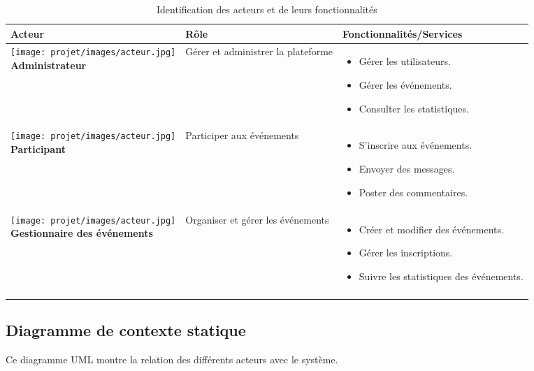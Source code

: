 \begin{longtable}{|p{4cm}|p{5cm}|p{6cm}|}
\hline
\textbf{Acteur} & \textbf{Rôle} & \textbf{Fonctionnalités/Services} \\ 
\hline
\parbox[c][3.5cm][c]{\linewidth}{\centering
\texttt{[image: projet/images/acteur.jpg]} \\[0.2cm] \textbf{Administrateur}
} & 
Gérer et administrer la plateforme & 
\begin{itemize}[leftmargin=0.5cm]
    \item Gérer les utilisateurs.
    \item Gérer les événements.
    \item Consulter les statistiques.
\end{itemize} \\ 
\hline

\parbox[c][3.5cm][c]{\linewidth}{\centering
\texttt{[image: projet/images/acteur.jpg]} \\[0.2cm] \textbf{Participant}
} & 
Participer aux événements & 
\begin{itemize}[leftmargin=0.5cm]
    \item S’inscrire aux événements.
    \item Envoyer des messages.
    \item Poster des commentaires.
\end{itemize} \\ 
\hline

\parbox[c][3.5cm][c]{\linewidth}{\centering
\texttt{[image: projet/images/acteur.jpg]} \\[0.2cm] \textbf{Gestionnaire des événements}
} & 
Organiser et gérer les événements & 
\begin{itemize}[leftmargin=0.5cm]
    \item Créer et modifier des événements.
    \item Gérer les inscriptions.
    \item Suivre les statistiques des événements.
\end{itemize} \\ 
\hline
\caption{Identification des acteurs et de leurs fonctionnalités}
\label{tab:identification_acteurs}
\end{longtable}


\subsection{Diagramme de contexte statique}
Ce diagramme UML montre la relation des différents acteurs avec le système.

